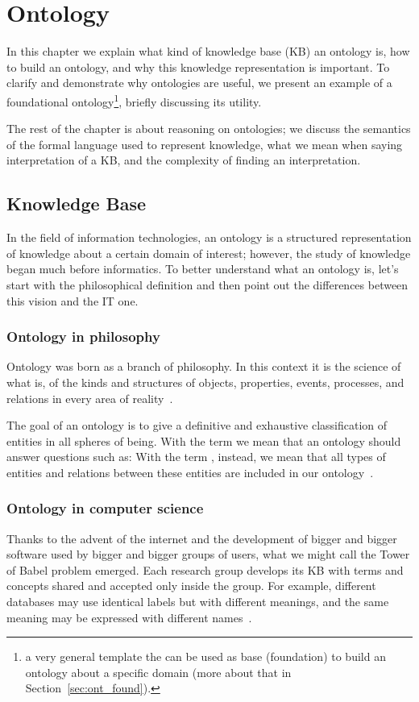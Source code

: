 \chapter{Ontology}
\label{ch:ont}
In this chapter we explain what kind of knowledge base (KB) an ontology is, how to build an ontology, and why this knowledge representation is important. To clarify and demonstrate why ontologies are useful, we present an example of a foundational ontology\footnote{a very general template the can be used as base (foundation) to build an ontology about a specific domain (more about that in Section~\ref{sec:ont_found}).}, briefly discussing its utility.

The rest of the chapter is about reasoning on ontologies; we discuss the semantics of the formal language used to represent knowledge, what we mean when saying interpretation of a KB, and the complexity of finding an interpretation.
\section{Knowledge Base}
In the field of information technologies, an ontology is a structured representation of knowledge about a certain domain of interest; however, the study of knowledge began much before informatics. To better understand what an ontology is, let's start with the philosophical definition and then point out the differences between this vision and the IT one.
\subsection{Ontology in philosophy}
Ontology was born as a branch of philosophy. In this context it is the science of what is, of the kinds and structures of objects, properties, events, processes, and relations in every area of reality~\cite{smith2012ontology}.

The goal of an ontology is to give a definitive and exhaustive classification of entities in all spheres of being. With the term  we mean that an ontology should answer questions such as:  With the term , instead, we mean that all types of entities and relations between these entities are included in our ontology~\cite{smith2012ontology}.

\subsection{Ontology in computer science}
Thanks to the advent of the internet and the development of bigger and bigger software used by bigger and bigger groups of users, what we might call the Tower of Babel problem emerged. Each research group develops its KB with terms and concepts shared and accepted only inside the group. For example, different databases may use identical labels but with different meanings, and the same meaning may be expressed with different names~\cite{smith2012ontology}. 

